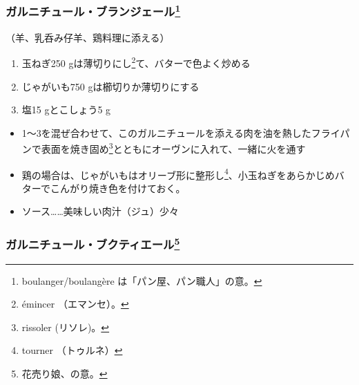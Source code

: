 \begin{recette}
\hypertarget{garniture-boulangere}{%
\subsubsection[ガルニチュール・ブランジェール]{\texorpdfstring{ガルニチュール・ブランジェール\footnote{boulanger/boulangère
  は「パン屋、パン職人」の意。}}{ガルニチュール・ブランジェール}}\label{garniture-boulangere}}



（羊、乳呑み仔羊、鶏料理に添える）

\begin{enumerate}
\def\labelenumi{\arabic{enumi}.}
\item
  玉ねぎ250 gは薄切りにし\footnote{émincer （エマンセ）。}て、バターで色よく炒める
\item
  じゃがいも750 gは櫛切りか薄切りにする
\item
  塩15 gとこしょう5 g
\end{enumerate}

\begin{itemize}
\item
  1〜3を混ぜ合わせて、このガルニチュールを添える肉を油を熱したフライパンで表面を焼き固め\footnote{rissoler
    (リソレ)。}とともにオーヴンに入れて、一緒に火を通す
\item
  鶏の場合は、じゃがいもはオリーブ形に整形し\footnote{tourner
    （トゥルネ）}、小玉ねぎをあらかじめバターでこんがり焼き色を付けておく。
\item
  ソース\ldots{}\ldots{}美味しい肉汁（ジュ）少々
\end{itemize}

\hypertarget{garniture-bouquetiere}{%
\subsubsection[ガルニチュール・ブクティエール]{\texorpdfstring{ガルニチュール・ブクティエール\footnote{花売り娘、の意。}}{ガルニチュール・ブクティエール}}\label{garniture-bouquetiere}}



\end{recette}
